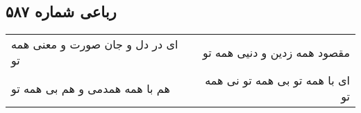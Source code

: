 \begin{center}
\section*{رباعی شماره ۵۸۷}
\label{sec:sh587}
\begin{longtable}{l p{0.5cm} r}
ای در دل و جان صورت و معنی همه تو
&&
مقصود همه زدین و دنیی همه تو
\\
هم با همه همدمی و هم بی همه تو
&&
ای با همه تو بی همه تو نی همه تو
\\
\end{longtable}
\end{center}

